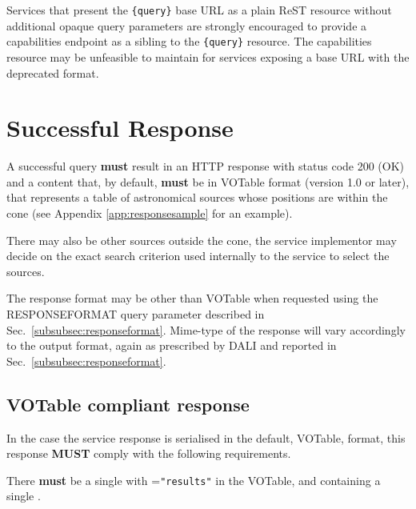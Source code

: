 \documentclass[11pt,a4paper]{ivoa}
\begin{document}
Services that present the \texttt{\{query\}} base URL as a plain ReST resource without additional opaque query parameters are strongly encouraged to provide a capabilities endpoint as a sibling to the \texttt{\{query\}} resource. The capabilities resource may be unfeasible to maintain for services exposing a base URL with the deprecated format.

\section{Successful Response}
\label{sec:response}
A successful query \textbf{must} result in an HTTP response with status code 200 (OK) and a content that, by default, \textbf{must} be in VOTable format (version 1.0 or later), that represents a table of astronomical sources whose positions are within the cone (see Appendix \ref{app:responsesample} for an example).  

There may also be other sources outside the cone, the service implementor may decide on the exact search criterion used internally to the service to select the sources.

The response format may be other than VOTable when requested using the RESPONSEFORMAT query parameter described in Sec.~\ref{subsubsec:responseformat}. Mime-type of the response will vary accordingly to the output format, again as prescribed by DALI and reported in Sec.~\ref{subsubsec:responseformat}.

\subsection{VOTable compliant response}

In the case the service response is serialised in the default, VOTable, format, this response \textbf{MUST} comply with the following requirements.

There \textbf{must} be a single  with =\texttt{"results"} in the VOTable, and containing a single .
\end{document}
